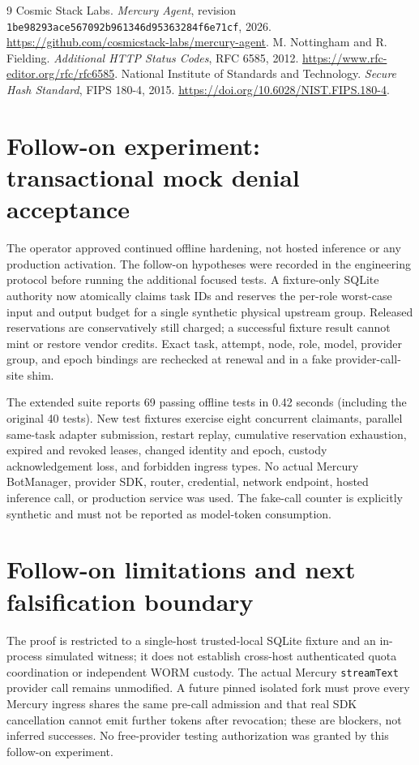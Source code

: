 \documentclass[11pt]{article}
\begin{document}
\begin{thebibliography}{9}
 Cosmic Stack Labs. \emph{Mercury Agent}, revision \texttt{1be98293ace567092b961346d95363284f6e71cf}, 2026. \url{https://github.com/cosmicstack-labs/mercury-agent}.
 M. Nottingham and R. Fielding. \emph{Additional HTTP Status Codes}, RFC 6585, 2012. \url{https://www.rfc-editor.org/rfc/rfc6585}.
 National Institute of Standards and Technology. \emph{Secure Hash Standard}, FIPS 180-4, 2015. \url{https://doi.org/10.6028/NIST.FIPS.180-4}.
\end{thebibliography}

\section{Follow-on experiment: transactional mock denial acceptance}
The operator approved continued offline hardening, not hosted inference or any
production activation. The follow-on hypotheses were recorded in the
engineering protocol before running the additional focused tests. A
fixture-only SQLite authority now atomically claims task IDs and reserves the
per-role worst-case input and output budget for a single synthetic physical
upstream group. Released reservations are conservatively still charged; a
successful fixture result cannot mint or restore vendor credits. Exact task,
attempt, node, role, model, provider group, and epoch bindings are rechecked
at renewal and in a fake provider-call-site shim.

The extended suite reports 69 passing offline tests in 0.42 seconds
(including the original 40 tests). New test fixtures exercise eight
concurrent claimants, parallel same-task adapter submission, restart replay,
cumulative reservation exhaustion, expired and revoked leases, changed
identity and epoch, custody acknowledgement loss, and forbidden ingress
types. No actual Mercury BotManager, provider SDK, router, credential,
network endpoint, hosted inference call, or production service was used.
The fake-call counter is explicitly synthetic and must not be reported as
model-token consumption.

\section{Follow-on limitations and next falsification boundary}
The proof is restricted to a single-host trusted-local SQLite fixture and
an in-process simulated witness; it does not establish cross-host authenticated
quota coordination or independent WORM custody. The actual Mercury
\texttt{streamText} provider call remains unmodified. A future pinned
isolated fork must prove every Mercury ingress shares the same pre-call
admission and that real SDK cancellation cannot emit further tokens after
revocation; these are blockers, not inferred successes. No free-provider
testing authorization was granted by this follow-on experiment.
\end{document}
